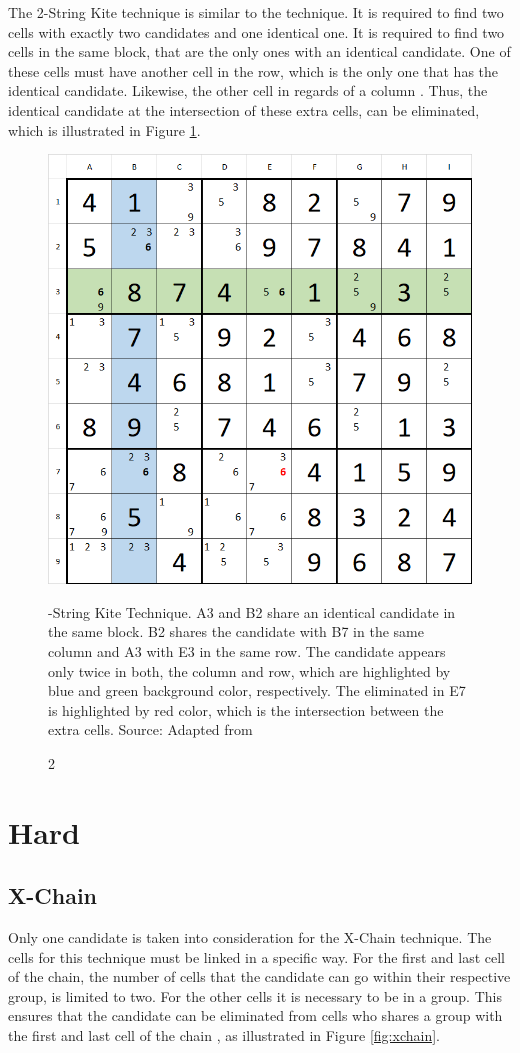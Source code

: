 \documentclass[twoside]{ausarbeitung}
\begin{document}
The 2-String Kite technique is similar to the  technique. It is required to find two cells with exactly two candidates and one identical one. It is required to find two cells in the same block, that are the only ones with an identical candidate. One of these cells must have another cell in the row, which is the only one that has the identical candidate. Likewise, the other cell in regards of a column \cite{Sudoku2S39:online}. Thus, the identical candidate at the intersection of these extra cells, can be eliminated, which is illustrated in Figure \ref{fig:2skite}.

\begin{figure}[H]
  \centering
  \includegraphics[width=.55\linewidth]{images/2skite}
  \caption[2-String Kite] 2-String Kite Technique. A3 and B2 share an identical candidate in the same block. B2 shares the candidate with B7 in the same column and A3 with E3 in the same row. The candidate appears only twice in both, the column and row, which are highlighted by blue and green background color, respectively. The eliminated in E7 is highlighted by red color, which is the intersection between the extra cells. Source: Adapted from \cite{AHRSudok73:online}
  \label{fig:2skite}
\end{figure}%











\section{Hard}

\subsection{X-Chain} \label{ss:xchain}
Only one candidate is taken into consideration for the X-Chain technique. The cells for this technique must be linked in a specific way. For the first and last cell of the chain, the number of cells that the candidate can go within their respective group, is limited to two. For the other cells it is necessary to be in a group. This ensures that the candidate can be eliminated from cells who shares a group with the first and last cell of the chain \cite{XChainSu93:online}, as illustrated in Figure \ref{fig:xchain}.
\end{document}
